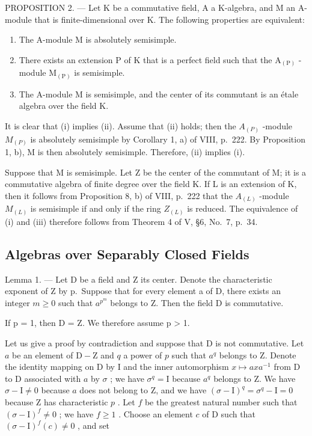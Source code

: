 PROPOSITION 2. --- Let K be a commutative field, A a K-algebra, and M an A-module that is finite-dimensional over K. The following properties are equivalent:

\begin{enumerate}
\def\labelenumi{(\roman{enumi})}
\item
  The A-module M is absolutely semisimple.
\item
  There exists an extension \(\mathrm{P}\) of \(\mathrm{K}\) that is a perfect field such that the \(\mathrm{A}_{(\mathrm{P})}\) -module \(\mathrm{M}_{(\mathrm{P})}\) is semisimple.
\item
  The A-module M is semisimple, and the center of its commutant is an étale algebra over the field K.
\end{enumerate}

It is clear that (i) implies (ii). Assume that (ii) holds; then the \(A_{(P)}\) -module \(M_{(P)}\) is absolutely semisimple by Corollary 1, a) of VIII, p.~222. By Proposition 1, b), M is then absolutely semisimple. Therefore, (ii) implies (i).

Suppose that M is semisimple. Let Z be the center of the commutant of M; it is a commutative algebra of finite degree over the field K. If L is an extension of K, then it follows from Proposition 8, b) of VIII, p.~222 that the \(A_{(L)}\) -module \(M_{(L)}\) is semisimple if and only if the ring \(Z_{(L)}\) is reduced. The equivalence of (i) and (iii) therefore follows from Theorem 4 of V, §6, No.~7, p.~34.

\subsection{Algebras over Separably Closed Fields}

Lemma 1. --- Let D be a field and Z its center. Denote the characteristic exponent of Z by p.~Suppose that for every element a of D, there exists an integer \(m \geqslant 0\) such that \(a^{p^{m}}\) belongs to Z. Then the field D is commutative.

If p = 1, then D = Z. We therefore assume p \textgreater{} 1.

Let us give a proof by contradiction and suppose that D is not commutative. Let \(a\) be an element of \(\mathrm{D} - \mathrm{Z}\) and \(q\) a power of \(p\) such that \(a^q\) belongs to Z. Denote the identity mapping on D by I and the inner automorphism \(x \mapsto axa^{-1}\) from D to D associated with \(a\) by \(\sigma\) ; we have \(\sigma^q = \mathrm{I}\) because \(a^q\) belongs to Z. We have \(\sigma - \mathrm{I} \neq 0\) because \(a\) does not belong to Z, and we have \((\sigma - \mathrm{I})^q = \sigma^q - \mathrm{I} = 0\) because Z has characteristic \(p\) . Let \(f\) be the greatest natural number such that \((\sigma - \mathrm{I})^f \neq 0\) ; we have \(f \geqslant 1\) . Choose an element \(c\) of D such that \((\sigma - \mathrm{I})^f(c) \neq 0\) , and set

